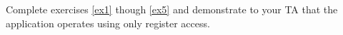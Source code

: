 \documentclass[11pt,fleqn]{book} %
\begin{document}
\begin{exercise}
    Complete exercises \ref{ex1} though \ref{ex5} and demonstrate to your TA that the application operates using only register access. 
    
    
    
\end{exercise}

%
%
%    
%
\end{document}
